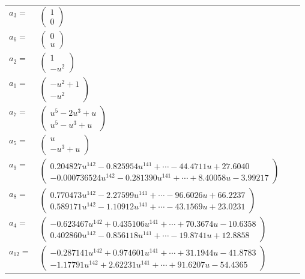 \documentclass[1p]{elsarticle_modified}
\theoremstyle{definition}
\begin{document}
\begin{tabular}{m{7pt} m{180pt} m{7pt} m{180pt} }
\flushright $a_{3}=$&$\begin{pmatrix}1\\0\end{pmatrix}$ \\
\flushright $a_{6}=$&$\begin{pmatrix}0\\u\end{pmatrix}$ \\
\flushright $a_{2}=$&$\begin{pmatrix}1\\- u^2\end{pmatrix}$ \\
\flushright $a_{1}=$&$\begin{pmatrix}- u^2+1\\- u^2\end{pmatrix}$ \\
\flushright $a_{7}=$&$\begin{pmatrix}u^5-2 u^3+u\\u^5- u^3+u\end{pmatrix}$ \\
\flushright $a_{5}=$&$\begin{pmatrix}u\\- u^3+u\end{pmatrix}$ \\
\flushright $a_{9}=$&$\begin{pmatrix}0.204827 u^{142}-0.825954 u^{141}+\cdots-44.4711 u+27.6040\\-0.000736524 u^{142}-0.281390 u^{141}+\cdots+8.40058 u-3.99217\end{pmatrix}$ \\
\flushright $a_{8}=$&$\begin{pmatrix}0.770473 u^{142}-2.27599 u^{141}+\cdots-96.6026 u+66.2237\\0.589171 u^{142}-1.10912 u^{141}+\cdots-43.1569 u+23.0231\end{pmatrix}$ \\
\flushright $a_{4}=$&$\begin{pmatrix}-0.623467 u^{142}+0.435106 u^{141}+\cdots+70.3674 u-10.6358\\0.402860 u^{142}-0.856118 u^{141}+\cdots-19.8741 u+12.8858\end{pmatrix}$ \\
\flushright $a_{12}=$&$\begin{pmatrix}-0.287141 u^{142}+0.974601 u^{141}+\cdots+31.1944 u-41.8783\\-1.17791 u^{142}+2.62231 u^{141}+\cdots+91.6207 u-54.4365\end{pmatrix}$ \\

\end{tabular}
\end{document}
